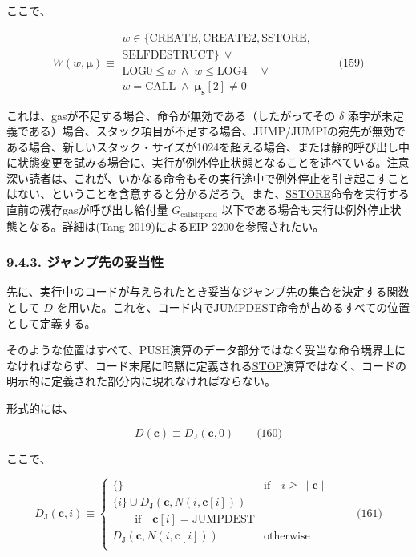 \documentclass[
]{ltjsarticle}
\begin{document}
ここで、

\protect\hypertarget{eq-159}{}{}

\[W(w, \boldsymbol{\mu}) \equiv
\begin{array}{l}
w \in \{\text{CREATE}, \text{CREATE2}, \text{SSTORE},\\ \text{SELFDESTRUCT}\} \ \vee \\
\text{LOG0} \le w \; \wedge \; w \le \text{LOG4} \quad \vee \\
w = \text{CALL} \; \wedge \; \boldsymbol{\mu}_{\mathbf{s}}[2] \neq 0
\end{array} \qquad \text{(159)}\]

これは、gasが不足する場合、命令が無効である（したがってその \(\delta\)
添字が未定義である）場合、スタック項目が不足する場合、JUMP/JUMPIの宛先が無効である場合、新しいスタック・サイズが1024を超える場合、または静的呼び出し中に状態変更を試みる場合に、実行が例外停止状態となることを述べている。注意深い読者は、これが、いかなる命令もその実行途中で例外停止を引き起こすことはない、ということを含意すると分かるだろう。また、\protect\hyperlink{SSTORE}{SSTORE}命令を実行する直前の残存gasが呼び出し給付量
\(G_{\mathrm{callstipend}}\)
以下である場合も実行は例外停止状態となる。詳細は\protect\hyperlink{ref-EIP-2200}{(Tang
2019)}によるEIP-2200を参照されたい。

\hypertarget{ux30b8ux30e3ux30f3ux30d7ux5148ux306eux59a5ux5f53ux6027}{%
\subsubsection{9.4.3.
ジャンプ先の妥当性}\label{ux30b8ux30e3ux30f3ux30d7ux5148ux306eux59a5ux5f53ux6027}}

先に、実行中のコードが与えられたとき妥当なジャンプ先の集合を決定する関数として
\(D\)
を用いた。これを、コード内でJUMPDEST命令が占めるすべての位置として定義する。

そのような位置はすべて、PUSH演算のデータ部分ではなく妥当な命令境界上になければならず、コード末尾に暗黙に定義される\protect\hyperlink{stop}{STOP}演算ではなく、コードの明示的に定義された部分内に現れなければならない。

形式的には、

\protect\hypertarget{eq-160}{}{}

\[D(\mathbf{c}) \equiv D_{\mathrm{J}}(\mathbf{c}, 0) \qquad \text{(160)}\]

ここで、

\protect\hypertarget{eq-161}{}{}

\[D_{\mathrm{J}}(\mathbf{c}, i) \equiv \begin{cases}
\{\} & \text{if} \quad i \geqslant \lVert \mathbf{c} \rVert  \\
\{ i \} \cup D_{\mathrm{J}}(\mathbf{c}, N(i, \mathbf{c}[i])) & \\
\quad\quad\text{if} \quad \mathbf{c}[i] = \text{JUMPDEST} \\
D_{\mathrm{J}}(\mathbf{c}, N(i, \mathbf{c}[i])) & \text{otherwise} \\
\end{cases} \qquad \text{(161)}\]
\end{document}
